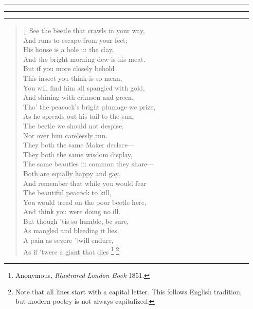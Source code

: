 \documentclass[oneside]{article}
\def\rulecolor{orange}
\def\rulecolor{white}
\def\Rule#1#2{%
  {\color{\rulecolor}
  \rule{#1}{#2}}
}
\def\floatright{\dimexpr\textwidth-80pt\relax}
\begin{document}
\Rule{5pt}{60pt}

\Rule{15pt}{53pt}
\Rule{15pt}{3pt}{\fbox{\vbox to 0pt{%
           \Rule{\floatright}{5pt}%
           \begin{picture}(0,0)
           \put(-13cm,-5cm){\hbox{\texttt{[image: beetle]}}}
           \end{picture}
}}}

\begin{verse}[\versewidth]
See the beetle that crawls in your way,\\
\vin And runs to escape from your feet;\\
His house is a hole in the clay,\\
\vin And the bright morning dew is his meat.\\
\bigskip
But if you more closely behold\\
\vin This insect you think is so mean,\\
You will find him all spangled with gold,\\
\vin And shining with crimson and green.\\
\bigskip
Tho' the peacock's bright plumage we prize,\\
\vin As he spreads out his tail to the sun,\\
The beetle we should not despise,\\
\vin Nor over him carelessly run.\\
\bigskip
They both the same Maker declare---\\
\vin They both the same wisdom display,\\
The same beauties in common they share---\\
\vin Both are equally happy and gay.\\
\bigskip
And remember that while you would fear\\
\vin The beautiful peacock to kill,\\
You would tread on the poor beetle here,\\
\vin And think you were doing no ill.\\
\bigskip
But though 'tis so humble, be sure,\\
\vin As mangled and bleeding it lies,\\
A pain as severe 'twill endure,\\
\vin As if 'twere a giant that dies%
\footnote{Anonymous, \textit{Illustrared London Book} 1851.}%
\footnote{Note that all lines start with a capital letter. 
This follows English tradition, but modern poetry is not always capitalized.}.\\
\end{verse}
\end{document}

